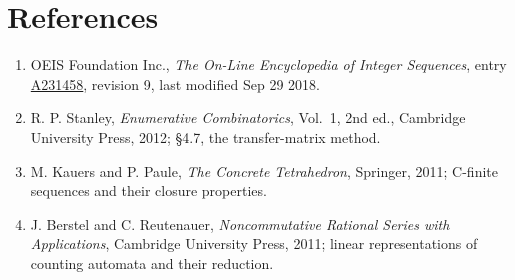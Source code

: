 \documentclass[11pt]{article}
\theoremstyle{definition}
\begin{document}
\section{References}

\begin{enumerate}

\item OEIS Foundation Inc., \emph{The On-Line Encyclopedia of Integer Sequences}, entry \href{https://oeis.org/A231458}{A231458}, revision 9, last modified Sep 29 2018.

\item R. P. Stanley, \emph{Enumerative Combinatorics}, Vol.~1, 2nd ed., Cambridge University Press, 2012; \S4.7, the transfer-matrix method.

\item M. Kauers and P. Paule, \emph{The Concrete Tetrahedron}, Springer, 2011; C-finite sequences and their closure properties.

\item J. Berstel and C. Reutenauer, \emph{Noncommutative Rational Series with Applications}, Cambridge University Press, 2011; linear representations of counting automata and their reduction.

\end{enumerate}
\end{document}
